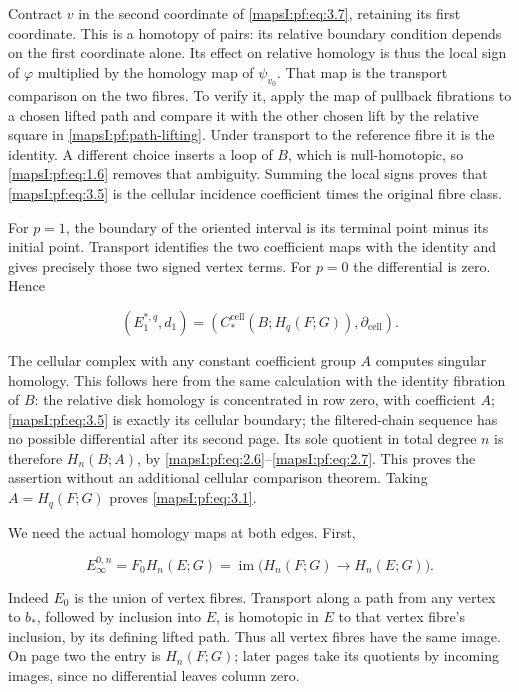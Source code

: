 Contract \(v\) in the second coordinate of \eqref{mapsI:pf:eq:3.7}, retaining its first coordinate. This is a homotopy of pairs: its relative boundary condition depends on the first coordinate alone. Its effect on relative homology is thus the local sign of \(\varphi\) multiplied by the homology map of \(\psi_{v_0}\). That map is the transport comparison on the two fibres. To verify it, apply the map of pullback fibrations to a chosen lifted path and compare it with the other chosen lift by the relative square in \cref{mapsI:pf:path-lifting}. Under transport to the reference fibre it is the identity. A different choice inserts a loop of \(B\), which is null-homotopic, so \eqref{mapsI:pf:eq:1.6} removes that ambiguity. Summing the local signs proves that \eqref{mapsI:pf:eq:3.5} is the cellular incidence coefficient times the original fibre class.

For \(p=1\), the boundary of the oriented interval is its terminal point minus its initial point. Transport identifies the two coefficient maps with the identity and gives precisely those two signed vertex terms. For \(p=0\) the differential is zero. Hence

\begin{equation}
(E_1^{*,q},d_1)=
(C_*^{\mathrm{cell}}(B;H_q(F;G)),\partial_{\mathrm{cell}}).
\label{mapsI:pf:eq:3.8}
\end{equation}

The cellular complex with any constant coefficient group \(A\) computes singular homology. This follows here from the same calculation with the identity fibration of \(B\): the relative disk homology is concentrated in row zero, with coefficient \(A\); \eqref{mapsI:pf:eq:3.5} is exactly its cellular boundary; the filtered-chain sequence has no possible differential after its second page. Its sole quotient in total degree \(n\) is therefore \(H_n(B;A)\), by \eqref{mapsI:pf:eq:2.6}--\eqref{mapsI:pf:eq:2.7}. This proves the assertion without an additional cellular comparison theorem. Taking \(A=H_q(F;G)\) proves \eqref{mapsI:pf:eq:3.1}.

We need the actual homology maps at both edges. First,

\begin{equation}
E_\infty^{0,n}=F_0H_n(E;G)
=\operatorname{im}\bigl(H_n(F;G)\to H_n(E;G)\bigr).
\label{mapsI:pf:eq:3.9}
\end{equation}

Indeed \(E_0\) is the union of vertex fibres. Transport along a path from any vertex to \(b_*\), followed by inclusion into \(E\), is homotopic in \(E\) to that vertex fibre's inclusion, by its defining lifted path. Thus all vertex fibres have the same image. On page two the entry is \(H_n(F;G)\); later pages take its quotients by incoming images, since no differential leaves column zero.

